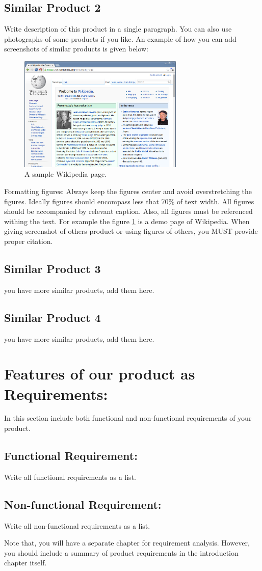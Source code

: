 \subsection{Similar Product 2}
Write description of this product in a single paragraph. 
You can also use photographs of some products if you like. An example of how you can add screenshots of similar products is given below:
\begin{figure}[h]
    \centering
    \includegraphics[width=0.7\textwidth]{figures/demoFigure1.png}
    \caption{A sample Wikipedia page.}
    \label{fig:wikiDemo}
\end{figure}
Formatting figures: Always keep the figures center and avoid overstretching the figures. Ideally figures should encompass less that 70\% of text width. 
All figures should be accompanied by relevant caption. Also, all figures must be referenced withing the text. For example the figure \ref{fig:wikiDemo} is a demo page of Wikipedia.
When giving screenshot of others product or using figures of others, you MUST provide proper citation.

\subsection{Similar Product 3}
you have more similar products, add them here.

\subsection{Similar Product 4}
you have more similar products, add them here.


\section{Features of our product as Requirements:}
In this section include both functional and non-functional requirements of your product.

\subsection{Functional Requirement:}
Write all functional requirements as a list.

\subsection{Non-functional Requirement:}
Write all non-functional requirements as a list.

Note that, you will have a separate chapter for requirement analysis. However, you should include a summary of product requirements in the introduction chapter itself.